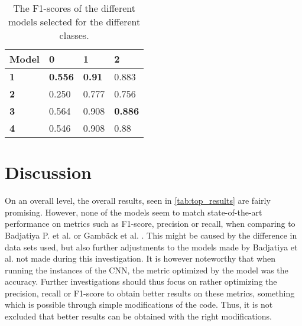 \documentclass[twocolumn]{article}
\begin{document}
\begin{table}[]

\begin{tabular}{|l|l|l|l|}
\hline
\textbf{Model} & \textbf{0} & \textbf{1} & \textbf{2} \\ \hline
\textbf{1}     & \textbf{0.556}      & \textbf{0.91}       & 0.883      \\ \hline
\textbf{2}     & 0.250 & 0.777 & 0.756 \\ \hline
\textbf{3}     & 0.564      & 0.908      & \textbf{0.886}      \\ \hline
\textbf{4}     & 0.546 & 0.908 & 0.88       \\ \hline
\end{tabular}
\caption{The F1-scores of the different models selected for the different classes.}
\label{tab:f1s}
\end{table}


\pagebreak


\section{Discussion}

On an overall level, the overall results, seen in \ref{tab:top_results} are fairly promising. However, none of the models seem to match state-of-the-art performance on metrics such as F1-score, precision or recall, when comparing to Badjatiya P. et al. \cite{DLNN} or Gamb\"ack et al. \cite{Gambck2017}. This might be caused by the difference in data sets used, but also further adjustments to the models made by Badjatiya et al. not made during this investigation. It is however noteworthy that when running the instances of the CNN, the metric optimized by the model was the accuracy. Further investigations should thus focus on rather optimizing the precision, recall or F1-score to obtain better results on these metrics, something which is possible through simple modifications of the code. Thus, it is not excluded that better results can be obtained with the right modifications. 
\end{document}
